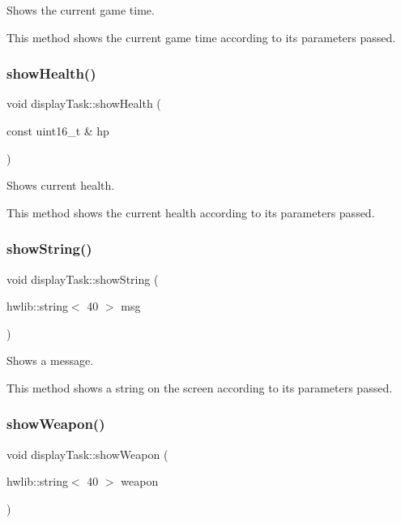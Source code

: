 Shows the current game time. 

This method shows the current game time according to its parameters passed. \mbox{\label{classdisplay_task_aa202bda76b1663f4be2b009fb358bd0f}} 
\subsubsection{\texorpdfstring{show\+Health()}{showHealth()}}
{\footnotesize\ttfamily void display\+Task\+::show\+Health (\begin{DoxyParamCaption}\item[{const uint16\+\_\+t \&}]{hp }\end{DoxyParamCaption})}



Shows current health. 

This method shows the current health according to its parameters passed. \mbox{\label{classdisplay_task_acccd3bfbaa4ad2b4c93ad229da70c531}} 
\subsubsection{\texorpdfstring{show\+String()}{showString()}}
{\footnotesize\ttfamily void display\+Task\+::show\+String (\begin{DoxyParamCaption}\item[{hwlib\+::string$<$ 40 $>$}]{msg }\end{DoxyParamCaption})}



Shows a message. 

This method shows a string on the screen according to its parameters passed. \mbox{\label{classdisplay_task_adefc6996b2cd23e2996bd93ef10a0bb8}} 
\subsubsection{\texorpdfstring{show\+Weapon()}{showWeapon()}}
{\footnotesize\ttfamily void display\+Task\+::show\+Weapon (\begin{DoxyParamCaption}\item[{hwlib\+::string$<$ 40 $>$}]{weapon }\end{DoxyParamCaption})}



